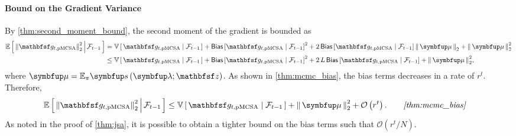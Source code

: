\begin{proofEnd}
  \paragraph{\textbf{Bound on the Gradient Variance}}
  By \cref{thm:second_moment_bound}, the second moment of the gradient is bounded as
  \begin{alignat}{2}
    \E{ {\lVert \rvvg_{t,\text{pMCSA}} \rVert}_2^2 \,\middle|\, \mathcal{F}_{t-1} } 
    &=
    \V{\rvvg_{t,\text{pMCSA}} \mid \mathcal{F}_{t-1}} + {\mathsf{Bias}\left[\rvvg_{t,\text{pMCSA}} \mid \mathcal{F}_{t-1}\right]}^2 + 2\, \mathsf{Bias}\left[\rvvg_{t,\text{pMCSA}} \mid \mathcal{F}_{t-1}\right] \norm{\vmu}_2 + \norm{\vmu}^2_2
    \nonumber
    \\
    &\leq
    \V{ \rvvg_{t,\text{pMCSA}} \mid \mathcal{F}_{t-1}} + {\mathsf{Bias}\left[\rvvg_{t,\text{pMCSA}} \mid \mathcal{F}_{t-1}\right]}^2 + 2\,L\,\mathsf{Bias}\left[\rvvg_{t,\text{pMCSA}} \mid \mathcal{F}_{t-1}\right] + \norm{\vmu}^2_2,
    \nonumber
  \end{alignat}
  where \(\vmu = \mathbb{E}_{\pi}\vs\left(\vlambda; \rvvz\right)\).
  As shown in \cref{thm:mcmc_bias}, the bias terms decreases in a rate of \(r^{t}\).
  Therefore, 
  \begin{alignat}{2}
    \E{ {\lVert \rvvg_{t,\text{pMCSA}} \rVert}_2^2 \,\middle|\, \mathcal{F}_{t-1} } 
    &\leq
    \V{ \rvvg_{t,\text{pMCSA}} \mid \mathcal{F}_{t-1}} + \norm{\vmu}^2_2 + \mathcal{O}\left(r^{t}\right).
    &&\quad\text{\textit{\cref{thm:mcmc_bias}}}
    \nonumber
  \end{alignat}
  As noted in the proof of \cref{thm:jsa}, it is possible to obtain a tighter bound on the bias terms such that \(\mathcal{O}\left(r^{t}/N\right)\).


\end{proofEnd}
